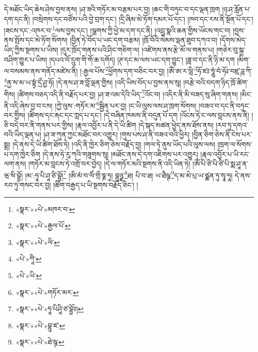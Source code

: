 དེ་མཐོང་ཡིད་ཆེས་ཤེས་བྱས་ནས། །ཤ་ཟའི་གཏོར་མ་བརྩམ་པར་བྱ། །ཆང་གི་བཏུང་བ་དང་ལྡན་ཁྲག །ཉ་ཤ་རློན་པ་དག་དང་ནི། །བསྲེགས་དང་བཙོས་པའི་བྱེ་བྲག་དང་། །དྲི་ཞིམ་མེ་ཏོག་དམར་པོ་དང་། །ཁབ་དང་རས་ནི་སྔོན་པོ་དང་། །ཟངས་དང་:འཁར་བ་\footnote{«སྣར་»«པེ་»མཁར་བ་}ལས་བྱས་དང་། །ལྕགས་ཀྱི་ཕྱེ་མ་དག་དང་ནི། །འབྲུ་སྣའི་ཆན་གྱིས་ཡོངས་གང་བ། །བྱས་ནས་སྤོས་དང་མེ་ཏོག་སོགས། །བྱིན་ཏེ་བོད་པ་ཡང་དག་བརྩམ། །ཁྲོ་བོའི་སེམས་ལྡན་ཐུབ་དཀའ་བ། །དོགས་མེད་ཡིད་ཀྱིས་སྔགས་པ་ཡིས། །དུར་ཁྲོད་གནས་པའི་ཤིང་གཅིག་ལ། །འཛེགས་ནས་རྩེ་མོ་ལ་གནས་པ། །གཅེར་བུ་སྐྲ་བཤིག་གྱུར་པ་ཡིས། །དཔའ་བོ་དྲུག་གི་གོ་ཆ་དགོད། །ཊ་དང་མ་ལས་ཡང་དག་བྱུང་། །ཟླ་བ་དང་ནི་ཉི་མ་དག །མིག་ལ་བསམས་ནས་གནོད་མཛེས་ནི། །:རྒྱལ་པོས་\footnote{«སྣར་»«པེ་»རྒྱལ་པོ་}ཕྱོགས་དག་བཅིང་བར་བྱ། །ཨོཾ་ཨ་ར་ལླི་\footnote{«སྣར་»«པེ་»ལི་}ཧོ་ཛཿ་ཧཱུཾ་བཾ་ཧོཿ་བཛྲ་ཌཱ་ཀི་\footnote{«པེ་»ཀཱི་}ནྱ་ས་མ་ཡ་སྟྭཾ་དྲྀ་ཤྱ་ཧོ། །དེ་ནས་ཤ་ཟ་བློ་ལྡན་གྱིས། །འདི་ཡིས་བོད་པ་བྱས་ནས་སུ། །བརྩེ་བའི་བདག་ཉིད་ཁྲོ་ཚིག་གིས། །ཚིགས་བཅད་འདི་ནི་བརྗོད་པར་བྱ། །ཤ་ཟ་འམ་དེའི་ཡིད་\footnote{«པེ་»ཡི་}འོང་བ། །འདིར་ནི་མི་བཟད་སུ་ཞིག་གནས། །མིང་ནི་འདི་ཞེས་བྱ་བ་ངས། །ཀྱེ་ལུས་:གཏོར་མ་\footnote{«སྣར་»«པེ་»གཏོར་མར་}སྦྱིན་པར་བྱ། །ང་ཡི་ལུས་ལས་ཤ་ཁྲག་སོགས། །བཟའ་བ་དང་ནི་བཏུང་བར་གྱིས། །ཚིགས་དང་རྐང་དང་ཀླད་པ་དང་། །དེ་བཞིན་ཁམས་ནི་བདུན་པོ་དག །འོངས་ཏེ་ང་ལས་བླངས་ནས་ནི། །ཅི་བདེ་བར་ནི་གནས་པར་གྱིས། །རྣལ་འབྱོར་པ་ནི་དེ་ཡི་ཚིག །དེ་སྐད་མཚན་ཕྱེད་ནས་ཐོས་ནས། །རབ་ཏུ་དགའ་བའི་ཡིད་ལྡན་པ། །ཤ་ཟ་ཀུན་ཀྱང་མཐོང་བར་འགྱུར། །གུས་པས་ཤ་ནི་བཟའ་བའི་ཕྱིར། །བྱིན་ཅིག་ཅེས་ནི་ངེས་པར་སྨྲ། །དེ་ནས་དེ་ཡི་ཚིག་ཐོས་ཏེ། །འདི་ནི་ཁྱེར་ཅིག་ཅེས་བརྗོད་བྱ། །གལ་ཏེ་ནུས་ཡོད་པའི་ལུས་ལས། །ཁྲག་ལ་སོགས་པ་དག་ཁྱེར་ཅིག །དེ་ནས་ཧེ་རུ་ཀའི་གཟུགས་སུ། །མཐོང་ནས་དེ་དག་འཇིགས་པར་འགྱུར། །རྣལ་འབྱོར་པ་ཡི་རང་ལག་ནས། །གཏོར་མ་བླངས་ཏེ་འགྲོ་བར་བྱེད། །དེ་ལ་གཏོར་མའི་སྔགས་ནི་འདི་ཡིན་ཏེ། །ཨོཾ་པི་ཙི་པི་ཙི་པི་སྨ་ཤཱ་ན་ཝ་སི་བྷྱོ། །མ་:ཧཱ་པི་ཤཱ་ཙི་བྷྱོ།\footnote{«སྣར་»«པེ་»ཧཱ་པིཤཱི་ཙ་བྷྱོཿ།} །ཨི་མཾ་བ་ལིཾ་གྲྀ་ཧྞ་ཏུ། བྷུཉྫ་\footnote{«སྣར་»«པེ་»བྷུ་ཛ་}ཐ། པི་བ་ཐ། ཡ་ཐཻཥྚ་\footnote{«སྣར་»«པེ་»ཐེ་ཥྚ་}ད་མ་མེ་པྲ་ཡ་ཙྪན་ཏུ་སྭཱ་ཧཱ། དེ་ནས་རབ་ཏུ་གསང་བར་བྱ། །ཚིག་བརྒྱད་པ་ཡི་སྔགས་བརྗོད་ཅིང་། །
